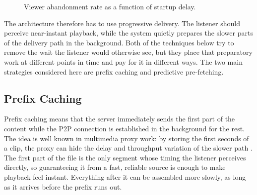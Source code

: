\begin{figure}[htbp]
    \centering
    \caption{Viewer abandonment rate as a function of startup delay\cite{quality_impact}.}
    \label{fig:latency_abandonment}
\end{figure}

\par The architecture therefore has to use progressive delivery. The listener should perceive near-instant playback, while the system quietly prepares the slower parts of the delivery path in the background. Both of the techniques below try to remove the wait the listener would otherwise see, but they place that preparatory work at different points in time and pay for it in different ways. The two main strategies considered here are prefix caching and predictive pre-fetching.

\subsection{Prefix Caching}
\indent \par Prefix caching means that the server immediately sends the first part of the content while the P2P connection is established in the background for the rest. The idea is well known in multimedia proxy work: by storing the first seconds of a clip, the proxy can hide the delay and throughput variation of the slower path \cite{prefix_caching}. The first part of the file is the only segment whose timing the listener perceives directly, so guaranteeing it from a fast, reliable source is enough to make playback feel instant. Everything after it can be assembled more slowly, as long as it arrives before the prefix runs out.

